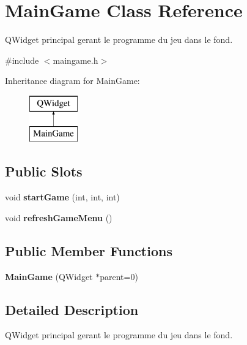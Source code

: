 \hypertarget{class_main_game}{}\section{Main\+Game Class Reference}
\label{class_main_game}


Q\+Widget principal gerant le programme du jeu dans le fond.  




{\ttfamily \#include $<$maingame.\+h$>$}

Inheritance diagram for Main\+Game\+:\begin{figure}[H]
\begin{center}
\leavevmode
\includegraphics[height=2.000000cm]{class_main_game}
\end{center}
\end{figure}
\subsection*{Public Slots}
\begin{DoxyCompactItemize}
\item 
\hypertarget{class_main_game_a550786eddde8209fffabba2c896c22ff}{}void {\bfseries start\+Game} (int, int, int)\label{class_main_game_a550786eddde8209fffabba2c896c22ff}

\item 
\hypertarget{class_main_game_a21e0447f9ff6eeaa12d8abbd7c34aafe}{}void {\bfseries refresh\+Game\+Menu} ()\label{class_main_game_a21e0447f9ff6eeaa12d8abbd7c34aafe}

\end{DoxyCompactItemize}
\subsection*{Public Member Functions}
\begin{DoxyCompactItemize}
\item 
\hypertarget{class_main_game_aba77e63bf031bc452693ba06986affe6}{}{\bfseries Main\+Game} (Q\+Widget $\ast$parent=0)\label{class_main_game_aba77e63bf031bc452693ba06986affe6}

\end{DoxyCompactItemize}


\subsection{Detailed Description}
Q\+Widget principal gerant le programme du jeu dans le fond. 

